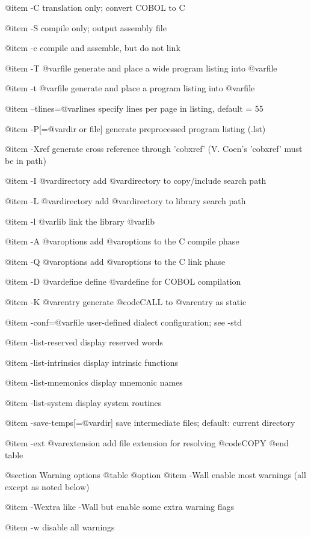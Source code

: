 @item -C
translation only; convert COBOL to C

@item -S
compile only; output assembly file

@item -c
compile and assemble, but do not link

@item -T @var{file}
generate and place a wide program listing into @var{file}

@item -t @var{file}
generate and place a program listing into @var{file}

@item --tlines=@var{lines}
specify lines per page in listing, default = 55

@item -P[=@var{dir or file}]
generate preprocessed program listing (.lst)

@item -Xref
generate cross reference through 'cobxref'
(V. Coen's 'cobxref' must be in path)

@item -I @var{directory}
add @var{directory} to copy/include search path

@item -L @var{directory}
add @var{directory} to library search path

@item -l @var{lib}
link the library @var{lib}

@item -A @var{options}
add @var{options} to the C compile phase

@item -Q @var{options}
add @var{options} to the C link phase

@item -D @var{define}
define @var{define} for COBOL compilation

@item -K @var{entry}
generate @code{CALL} to @var{entry} as static

@item -conf=@var{file}
user-defined dialect configuration; see -std

@item -list-reserved
display reserved words

@item -list-intrinsics
display intrinsic functions

@item -list-mnemonics
display mnemonic names

@item -list-system
display system routines

@item -save-temps[=@var{dir}]
save intermediate files; default: current directory

@item -ext @var{extension}
add file extension for resolving @code{COPY}
@end table

@section Warning options
@table @option
@item -Wall
enable most warnings (all except as noted below)

@item -Wextra
like -Wall but enable some extra warning flags

@item -w
disable all warnings

